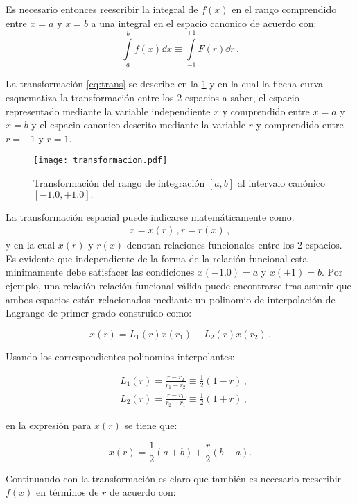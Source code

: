 Es necesario entonces reescribir la integral de $f(x)$ en el rango comprendido entre $x=a$ y $x=b$ a una integral en el espacio canonico de acuerdo con:
\begin{equation}
\int\limits_a^b f(x) \dd{x} \equiv \int\limits_{-1}^{+1} F(r) \dd{r}\, . 
\label{eq:trans}
\end{equation}


La transformación \ref{eq:trans} se describe en la \cref{fig:map} y en la cual la flecha curva esquematiza la transformación entre los 2 espacios a saber, el espacio representado mediante la variable independiente $x$ y 
comprendido entre $x=a$ y $x=b$ y el espacio canonico descrito mediante la variable  $r$ y comprendido entre $r=-1$ y  $r=1$.

\begin{figure}[H]
\centering
\texttt{[image: transformacion.pdf]}
\caption{Transformación del rango de integración $[a,b]$ al intervalo canónico 
$[-1.0,+1.0].$}
\label{fig:map}
\end{figure}

La transformación espacial puede indicarse matemáticamente como:
\begin{align*}
  x = x(r)\, ,
  r = r(x)\, ,
\end{align*}
y en la cual $x(r)$ y $r(x)$ denotan relaciones funcionales entre los 2 espacios. Es evidente que independiente de la forma de la relación funcional esta minimamente debe satisfacer las condiciones $x(-1.0)=a$ y $x(+1)=b$. Por ejemplo, una relación relación funcional válida puede encontrarse tras asumir que ambos espacios están relacionados mediante un polinomio de interpolación de Lagrange de primer grado construido como:

\[x(r) = L_1(r) x(r_1) + L_2(r) x(r_2)\, .\]

Usando los correspondientes polinomios interpolantes:

\begin{align*}
  &L_1(r) = \frac{r - r_2}{r_1 - r_2} \equiv \frac{1}{2}(1 - r)\, ,\\
  &L_2(r) = \frac{r - r_1}{r_2 - r_1} \equiv \frac{1}{2}(1 + r)\, ,
\end{align*}

en la expresión para $x(r)$ se tiene que:

\[x(r) = \frac{1}{2}(a + b) + \frac{r}{2}(b - a).\]

Continuando con la transformación es claro que también es necesario reescribir $f(x)$ en términos de  $r$  de acuerdo con:

